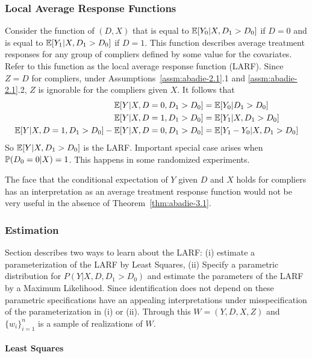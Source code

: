 \subsubsection{Local Average Response Functions}

Consider the function of $(D,X)$ that is equal to $\E[Y_0 | X, D_1 > D_0]$ if $D = 0$ and is equal to $\E[Y_1 | X, D_1 > D_0]$ if $D = 1$. This function describes average treatment responses for any group of compliers defined by some value for the covariates. Refer to this function as the local average response function (LARF). Since $Z = D$ for compliers, under Assumptions~\ref{assm:abadie-2.1}.1 and \ref{assm:abadie-2.1}.2, $Z$ is ignorable for the compliers given $X$. It follows that
\begin{align*}
	\E[Y | X, D= 0, D_1 > D_0] &= \E[Y_0 | D_1 > D_0] \\
	\E[Y | X, D=1, D_1 > D_0] &= \E[Y_1 | X, D_1 > D_0] \\
	\E[Y | X, D=1, D_1 > D_0] - \E[Y|X, D= 0, D_1 > D_0] &= \E[Y_1 - Y_0|X, D_1 > D_0]
\end{align*}
So $\E[Y | X, D_1 > D_0]$ is the LARF. Important special case arises when $\P(D_0 = 0 | X) = 1$. This happens in some randomized experiments.

The face that the conditional expectation of $Y$ given $D$ and $X$ holds for compliers has an interpretation as an average treatment response function would not be very useful in the absence of Theorem~\ref{thm:abadie-3.1}. 

\subsubsection{Estimation}

Section describes two ways to learn about the LARF: (i) estimate a parameterization of the LARF by Least Squares, (ii) Specify a parametric distribution for $P(Y|X,D,D_1>D_0)$ and estimate the parameters of the LARF by a Maximum Likelihood. Since identification does not depend on these parametric specifications have an appealing interpretations under misspecification of the parameterization in (i) or (ii). Through this $W = (Y,D,X,Z)$ and $\{w_i\}_{i=1}^n$ is a sample of realizations of $W$. 

\paragraph{Least Squares}

